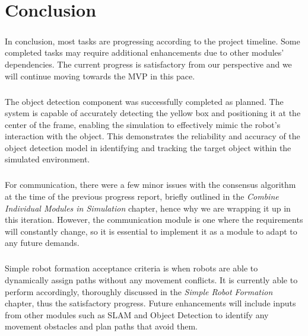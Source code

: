 \chapter{Conclusion}

\paragraph*{}
In conclusion, most tasks are progressing according to the project timeline. Some completed tasks may require additional enhancements due to other modules' dependencies. The current progress is satisfactory from our perspective and we will continue moving towards the MVP in this pace.

\paragraph*{}
The object detection component was successfully completed as planned. The system is capable of accurately detecting the yellow box and positioning it at the center of the frame, enabling the simulation to effectively mimic the robot's interaction with the object. This demonstrates the reliability and accuracy of the object detection model in identifying and tracking the target object within the simulated environment.

\paragraph*{}
For communication, there were a few minor issues with the consensus algorithm at the time of the previous progress report, briefly outlined in the \textit{Combine Individual Modules in Simulation} chapter, hence why we are wrapping it up in this iteration. However, the communication module is one where the requirements will constantly change, so it is essential to implement it as a module to adapt to any future demands.

\paragraph*{}
Simple robot formation acceptance criteria is when robots are able to dynamically assign paths without any movement conflicts. It is currently able to perform accordingly, thoroughly discussed in the \textit{Simple Robot Formation} chapter, thus the satisfactory progress. Future enhancements will include inputs from other modules such as SLAM and Object Detection to identify any movement obstacles and plan paths that avoid them.
